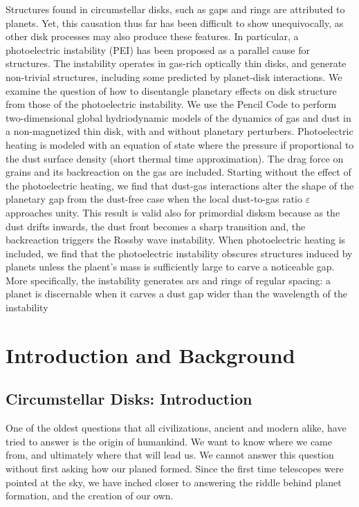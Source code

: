 \documentclass[onecolumn]{report}
\begin{document}
Structures found in circumstellar disks, such as gaps and rings are attributed to planets. Yet, this causation thus far has been difficult to show unequivocally, as other disk processes may also produce these features. In particular, a photoelectric instability (PEI) has been proposed as a parallel cause for structures. The instability operates in gas-rich optically thin disks, and generate non-trivial structures, including some predicted by planet-disk interactions. We examine the question of how to disentangle planetary effects on disk structure from those of the photoelectric instability. We use the Pencil Code to perform two-dimensional global hydriodynamic models of the dynamics of gas and dust in a non-magnetized thin disk, with and without planetary perturbers. Photoelectric heating is modeled with an equation of state where the pressure if proportional to the dust surface density (short thermal time approximation). The drag force on grains and its backreaction on the gas are included. Starting without the effect of the photoelectric heating, we find that dust-gas interactions alter the shape of the planetary gap from the dust-free case when the local dust-to-gas ratio $\varepsilon$ approaches unity. This result is valid also for primordial disksm because as the dust drifts inwards, the dust front becomes a sharp transition and, the backreaction triggers the Rossby wave instability. When photoelectric heating is included, we find that the photoelectric instability obscures structures induced by planets unless the plaent's mass is sufficiently large to carve a noticeable gap. More specifically, the instability generates ars and rings of regular spacing: a planet is discernable when it carves a dust gap wider than the wavelength of the instability

\chapter{Introduction and Background} %

\setcounter{page}{1}

\section{Circumstellar Disks: Introduction}

One of the oldest questions that all civilizations, ancient and modern alike, have tried to answer is the origin of humankind. We want to know where we came from, and ultimately where that will lead us. We cannot answer this question without first asking how our planed formed. Since the first time telescopes were pointed at the sky, we have inched closer  to answering the riddle behind planet formation, and the creation of our own.
\end{document}
